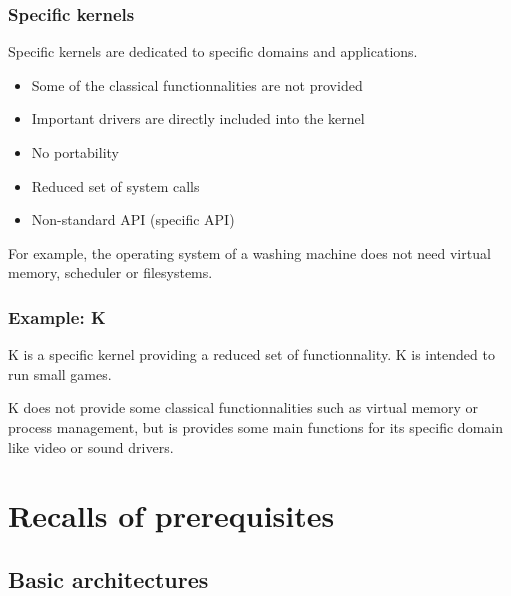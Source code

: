 %
%

\begin{frame}
  \frametitle{Specific kernels}

  Specific kernels are dedicated to specific domains and applications.

  \begin{itemize}
  \item
    Some of the classical functionnalities are not provided
  \item
    Important drivers are directly included into the kernel
  \item
    No portability
  \item
    Reduced set of system calls
  \item
    Non-standard API (specific API)
  \end{itemize}

  \-

  For example, the operating system of a washing machine does not need
  virtual memory, scheduler or filesystems.

\end{frame}

%
%

\begin{frame}
  \frametitle{Example: K}

  K is a specific kernel providing a reduced set of functionnality. K
  is intended to run small games.

  \begin{center}
  \end{center}

  K does not provide some classical functionnalities such as virtual
  memory or process management, but is provides some main functions
  for its specific domain like video or sound drivers.

\end{frame}

%
%

\section{Recalls of prerequisites}

%
%

\subsection{Basic architectures}

